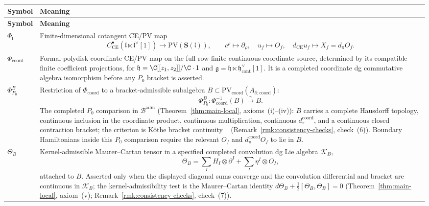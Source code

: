 \begin{longtable}{@{}>{\raggedright\arraybackslash}p{}
  >{\raggedright\arraybackslash}p{}@{}}
\hline
\textbf{Symbol} & \textbf{Meaning}\\
\hline
\endfirsthead
\hline
\textbf{Symbol} & \textbf{Meaning}\\
\hline
\endhead
\(\Phi_{\mathfrak l}\) &
Finite-dimensional cotangent CE/PV map
\[
  C^\bullet_{\mathrm{CE}}
  (\mathfrak l\ltimes \mathfrak l^\vee[1])
  \to \mathrm{PV}(\mathbf S(\mathfrak l)),
  \qquad c^\rho\mapsto\partial_\rho,\quad u_f\mapsto O_f,
  \quad d_{\mathrm{CE}}u_f\mapsto X_f=d_\pi O_f.
\]\\
\hline
\(\Phi_{\mathrm{coord}}\) &
Formal-polydisk coordinate CE/PV map on the full row-finite continuous
coordinate source, determined by its compatible finite coefficient
projections, for
\(\mathfrak h=\C[[z_1,z_2]]/\C\cdot1\) and
\(\mathfrak g=\mathfrak h\ltimes
\mathfrak h^\vee_{\mathrm{cont}}[1]\).  It is a completed coordinate dg
commutative algebra isomorphism before any \(P_0\) bracket is asserted.\\
\hline
\(\Phi^B_{P_0}\) &
Restriction of \(\Phi_{\mathrm{coord}}\) to a bracket-admissible
subalgebra \(B\subset
\mathrm{PV}_{\mathrm{coord}}(A_{\partial,\mathrm{coord}})\):
\[
  \Phi^B_{P_0}\colon\Phi_{\mathrm{coord}}^{-1}(B)\xrightarrow{\sim}B .
\]
The completed \(P_0\) comparison in \(\mathcal B^{\mathrm{adm}}\)
(Theorem~\ref{thm:main-local}, axioms~(i)--(iv)): \(B\) carries a
complete Hausdorff topology, continuous inclusion in the coordinate
product, continuous multiplication, continuous
\(d_\pi^{\mathrm{coord}}\), and a continuous closed contraction bracket;
the criterion is Köthe bracket continuity
~\cite{kothe-topological-vector-spaces}
(Remark~\ref{rmk:consistency-checks}, check~(6)).
Boundary Hamiltonians inside this \(P_0\) comparison require the relevant
\(O_f\) and \(d_\pi^{\mathrm{coord}}O_f\) to lie in \(B\).\\
\hline
\(\Theta_B\) &
Kernel-admissible Maurer--Cartan tensor in a specified completed
convolution dg Lie algebra \(\mathcal K_B\),
\[
  \Theta_B=\sum_I H_I\otimes\partial^I+\sum_I\eta^I\otimes O_I ,
\]
attached to \(B\).  Asserted only when the displayed diagonal sums
converge and the convolution differential and bracket are continuous
in \(\mathcal K_B\); the kernel-admissibility test is the Maurer--Cartan
identity \(d\Theta_B+\tfrac12[\Theta_B,\Theta_B]=0\)
(Theorem~\ref{thm:main-local}, axiom~(v);
Remark~\ref{rmk:consistency-checks}, check~(7)).\\

\end{longtable}
